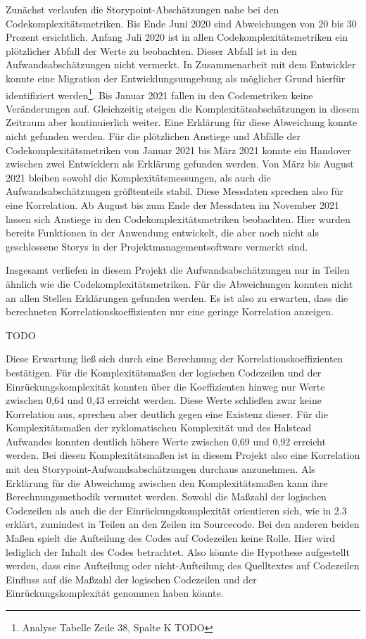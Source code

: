 Zunächst verlaufen die Storypoint-Abschätzungen nahe bei den
Codekomplexitätsmetriken. Bis Ende Juni 2020 sind Abweichungen von 20
bis 30 Prozent ersichtlich. Anfang Juli 2020 ist in allen
Codekomplexitätsmetriken ein plötzlicher Abfall der Werte zu beobachten.
Dieser Abfall ist in den Aufwandsabschätzungen nicht vermerkt. In
Zusammenarbeit mit dem Entwickler konnte eine Migration der
Entwicklungsumgebung als möglicher Grund hierfür identifiziert
werden\footnote{Analyse Tabelle Zeile 38, Spalte K TODO}. Bis Januar 2021
fallen in den Codemetriken keine Veränderungen auf. Gleichzeitig steigen
die Komplexitätsabschätzungen in diesem Zeitraum aber kontinuierlich
weiter. Eine Erklärung für diese Abweichung konnte nicht gefunden
werden. Für die plötzlichen Anstiege und Abfälle der
Codekomplexitätsmetriken von Januar 2021 bis März 2021 konnte ein
Handover zwischen zwei Entwicklern als Erklärung gefunden werden. Von
März bis August 2021 bleiben sowohl die Komplexitätsmessungen, als auch
die Aufwandsabschätzungen größtenteils stabil. Diese Messdaten sprechen
also für eine Korrelation. Ab August bis zum Ende der Messdaten im
November 2021 lassen sich Anstiege in den Codekomplexitätsmetriken
beobachten. Hier wurden bereits Funktionen in der Anwendung entwickelt,
die aber noch nicht als geschlossene Storys in der
Projektmanagementsoftware vermerkt sind.

Insgesamt verliefen in diesem Projekt die Aufwandsabschätzungen nur in
Teilen ähnlich wie die Codekomplexitätsmetriken. Für die Abweichungen
konnten nicht an allen Stellen Erklärungen gefunden werden. Es ist also
zu erwarten, dass die berechneten Korrelationskoeffizienten nur eine
geringe Korrelation anzeigen.

TODO

Diese Erwartung ließ sich durch eine Berechnung der
Korrelationskoeffizienten bestätigen. Für die Komplexitätsmaßen der
logischen Codezeilen und der Einrückungskomplexität konnten über die
Koeffizienten hinweg nur Werte zwischen 0,64 und 0,43 erreicht werden.
Diese Werte schließen zwar keine Korrelation aus, sprechen aber deutlich
gegen eine Existenz dieser. Für die Komplexitätsmaßen der zyklomatischen
Komplexität und des Halstead Aufwandes konnten deutlich höhere Werte
zwischen 0,69 und 0,92 erreicht werden. Bei diesen Komplexitätsmaßen ist
in diesem Projekt also eine Korrelation mit den
Storypoint-Aufwandsabschätzungen durchaus anzunehmen. Als Erklärung für
die Abweichung zwischen den Komplexitätsmaßen kann ihre
Berechnungsmethodik vermutet werden. Sowohl die Maßzahl der logischen
Codezeilen als auch die der Einrückungskomplexität orientieren sich, wie
in 2.3 erklärt, zumindest in Teilen an den Zeilen im Sourcecode. Bei den
anderen beiden Maßen spielt die Aufteilung des Codes auf Codezeilen
keine Rolle. Hier wird lediglich der Inhalt des Codes betrachtet. Also
könnte die Hypothese aufgestellt werden, dass eine Aufteilung oder
nicht-Aufteilung des Quelltextes auf Codezeilen Einfluss auf die Maßzahl
der logischen Codezeilen und der Einrückungskomplexität genommen haben
könnte.

